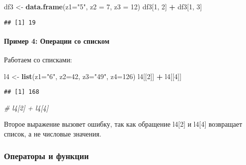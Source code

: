 \documentclass[
]{article}
\newenvironment{Shaded}{\begin{snugshade}}{\end{snugshade}}
\newcommand{\AttributeTok}[1]{\textcolor[rgb]{0.13,0.29,0.53}{#1}}
\newcommand{\CommentTok}[1]{\textcolor[rgb]{0.56,0.35,0.01}{\textit{#1}}}
\newcommand{\DecValTok}[1]{\textcolor[rgb]{0.00,0.00,0.81}{#1}}
\newcommand{\FunctionTok}[1]{\textcolor[rgb]{0.13,0.29,0.53}{\textbf{#1}}}
\newcommand{\NormalTok}[1]{#1}
\newcommand{\OtherTok}[1]{\textcolor[rgb]{0.56,0.35,0.01}{#1}}
\newcommand{\SpecialCharTok}[1]{\textcolor[rgb]{0.81,0.36,0.00}{\textbf{#1}}}
\newcommand{\StringTok}[1]{\textcolor[rgb]{0.31,0.60,0.02}{#1}}
\begin{document}
\begin{Shaded}
\begin{Highlighting}[]
\NormalTok{df3 }\OtherTok{\textless{}{-}} \FunctionTok{data.frame}\NormalTok{(}\AttributeTok{z1=}\StringTok{"5"}\NormalTok{, }\AttributeTok{z2 =} \DecValTok{7}\NormalTok{, }\AttributeTok{z3 =} \DecValTok{12}\NormalTok{)}
\NormalTok{df3[}\DecValTok{1}\NormalTok{, }\DecValTok{2}\NormalTok{] }\SpecialCharTok{+}\NormalTok{ df3[}\DecValTok{1}\NormalTok{, }\DecValTok{3}\NormalTok{]}
\end{Highlighting}
\end{Shaded}

\begin{verbatim}
## [1] 19
\end{verbatim}

\paragraph{Пример 4: Операции со
списком}\label{ux43fux440ux438ux43cux435ux440-4-ux43eux43fux435ux440ux430ux446ux438ux438-ux441ux43e-ux441ux43fux438ux441ux43aux43eux43c}

Работаем со списками:

\begin{Shaded}
\begin{Highlighting}[]
\NormalTok{l4 }\OtherTok{\textless{}{-}} \FunctionTok{list}\NormalTok{(}\AttributeTok{z1=}\StringTok{"6"}\NormalTok{, }\AttributeTok{z2=}\DecValTok{42}\NormalTok{, }\AttributeTok{z3=}\StringTok{"49"}\NormalTok{, }\AttributeTok{z4=}\DecValTok{126}\NormalTok{)}
\NormalTok{l4[[}\DecValTok{2}\NormalTok{]] }\SpecialCharTok{+}\NormalTok{ l4[[}\DecValTok{4}\NormalTok{]]}
\end{Highlighting}
\end{Shaded}

\begin{verbatim}
## [1] 168
\end{verbatim}

\begin{Shaded}
\begin{Highlighting}[]
\CommentTok{\# l4[2] + l4[4]}
\end{Highlighting}
\end{Shaded}

Второе выражение вызовет ошибку, так как обращение l4{[}2{]} и l4{[}4{]}
возвращает список, а не числовые значения.

\subsubsection{Операторы и
функции}\label{ux43eux43fux435ux440ux430ux442ux43eux440ux44b-ux438-ux444ux443ux43dux43aux446ux438ux438}
\end{document}
